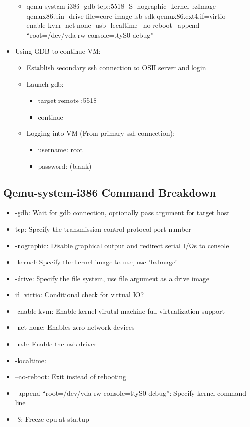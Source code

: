 \documentclass[a4paper]{article}
\begin{document}
\begin{itemize}
        \begin{itemize}
          \item qemu-system-i386 -gdb tcp::5518 -S -nographic -kernel bzImage-qemux86.bin -drive file=core-image-lsb-sdk-qemux86.ext4,if=virtio -enable-kvm -net none -usb -localtime --no-reboot --append ``root=/dev/vda rw console=ttyS0 debug''
         \end{itemize}
    \item Using GDB to continue VM:
    \begin{itemize}
      \item Establish secondary ssh connection to OSII server and login
        \item Launch gdb:
        \begin{itemize}
          \item target remote :5518
            \item continue
        \end{itemize}
    \item Logging into VM (From primary ssh connection):
    \begin{itemize}
      \item username: root
        \item password: (blank)
    \end{itemize}
    \end{itemize}
\end{itemize}


\subsection{Qemu-system-i386 Command Breakdown}
\begin{itemize}
  \item -gdb: Wait for gdb connection, optionally pass argument for target host
    \item tcp: Specify the transmission control protocol port number
    \item -nographic: Disable graphical output and redirect serial I/Os to console
    \item -kernel: Specify the kernel image to use, use 'bzImage'
    \item -drive: Specify the file system, use file argument as a drive image
    \item if=virtio: Conditional check for virtual IO?
    \item -enable-kvm: Enable kernel virutal machine full virtualization support
    \item -net none: Enables zero network devices
    \item -usb: Enable the usb driver
    \item -localtime: 
    \item --no-reboot: Exit instead of rebooting
    \item --append ``root=/dev/vda rw console=ttyS0 debug'': Specify kernel command line
    \item -S: Freeze cpu at startup
\end{itemize}
\end{document}
